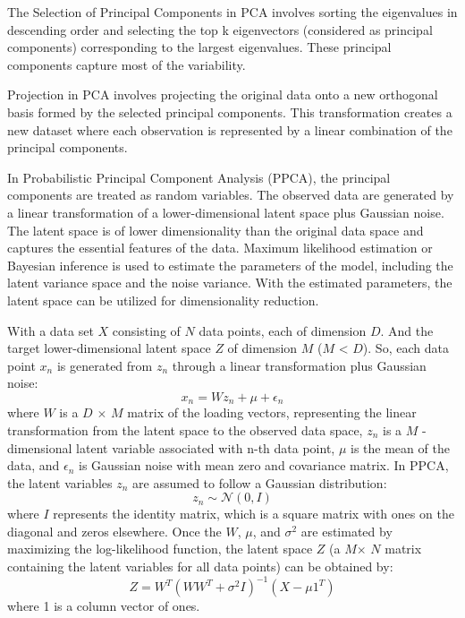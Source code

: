 \documentclass[12pt,a4paper,english
]{tunithesis}
\begin{document}
The Selection of Principal Components in PCA involves sorting the eigenvalues in descending order and selecting the top k eigenvectors (considered as principal components) corresponding to the largest eigenvalues. These principal components capture most of the variability.

Projection in PCA involves projecting the original data onto a new orthogonal basis formed by the selected principal components. This transformation creates a new dataset where each observation is represented by a linear combination of the principal components.

In Probabilistic Principal Component Analysis (PPCA), the principal components are treated as random variables. The observed data are generated by a linear transformation of a lower-dimensional latent space plus Gaussian noise. The latent space is of lower dimensionality than the original data space and captures the essential features of the data. Maximum likelihood estimation or Bayesian inference is used to estimate the parameters of the model, including the latent variance space and the noise variance. With the estimated parameters, the latent space can be utilized for dimensionality reduction.

With a data set $X$ consisting of $N$ data points, each of dimension $D$. And the target lower-dimensional latent space $Z$ of dimension $M$ ($M$ < $D$). So, each data point $x_n$ is generated from $z_n$ through a linear transformation plus Gaussian noise:
\begin{equation}
    {x_n} = {W}{z_n}+{\mu}+{\epsilon _n}
\end{equation}
where $W$ is a $D$ $\times$ $M$ matrix of the loading vectors, representing the linear transformation from the latent space to the observed data space, $z_n$ is a $M$ -dimensional latent variable associated with n-th data point, $\mu$ is the mean of the data, and $\epsilon _n$ is Gaussian noise with mean zero and covariance matrix.
In PPCA, the latent variables $z_n$ are assumed to follow a Gaussian distribution:
\begin{equation}
    {z_n} \sim {\mathcal{N}}(0, {I})
\end{equation}
where $I$ represents the identity matrix, which is a square matrix with ones on the diagonal and zeros elsewhere. Once the $W$, $\mu$, and $\sigma ^2$ are estimated by maximizing the log-likelihood function, the latent space $Z$ (a $M$$\times$ $N$ matrix containing the latent variables for all data points) can be obtained by:
\begin{equation}
    {Z} = {W^T}{({W}{W^T}+{\sigma ^2}{I})^{-1}}({X}-{\mu}{1^T})
\end{equation}
where 1 is a column vector of ones.
\end{document}
